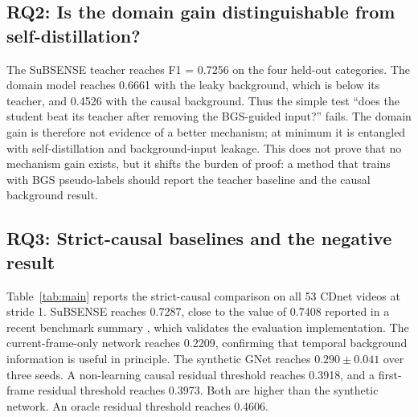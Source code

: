 \documentclass[sn-mathphys-num,iicol]{sn-jnl}
\begin{document}
\subsection{RQ2: Is the domain gain distinguishable from self-distillation?}\label{sec:rq2}

The SuBSENSE teacher reaches F1 = 0.7256 on the four held-out categories. The
domain model reaches 0.6661 with the leaky background, which is below its teacher,
and 0.4526 with the causal background. Thus the simple test ``does the student
beat its teacher after removing the BGS-guided input?'' fails. The domain gain is
therefore not evidence of a better mechanism; at minimum it is entangled with
self-distillation and background-input leakage. This does not prove that no
mechanism gain exists, but it shifts the burden of proof: a method that trains
with BGS pseudo-labels should report the teacher baseline and the causal
background result.

\subsection{RQ3: Strict-causal baselines and the negative result}\label{sec:rq3}

Table~\ref{tab:main} reports the strict-causal comparison on all 53 CDnet videos
at stride 1. SuBSENSE reaches 0.7287, close to the value of 0.7408 reported in a
recent benchmark summary \cite{zbs2023}, which validates the evaluation
implementation. The current-frame-only network reaches 0.2209, confirming that
temporal background information is useful in principle. The synthetic GNet
reaches $0.290\pm0.041$ over three seeds. A non-learning causal residual
threshold reaches 0.3918, and a first-frame residual threshold reaches 0.3973.
Both are higher than the synthetic network. An oracle residual threshold reaches
0.4606.
\end{document}
